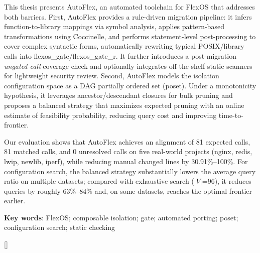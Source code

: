 \documentclass[UTF8,a4paper,12pt]{ctexart}
\numberwithin{equation}{section}
\renewcommand\thesection{\arabic{section}}
\begin{document}
This thesis presents AutoFlex, an automated toolchain for
FlexOS that addresses both barriers. First, AutoFlex provides a
rule-driven migration pipeline: it infers function-to-library mappings
via symbol analysis, applies pattern-based transformations using
Coccinelle, and performs statement-level post-processing to cover
complex syntactic forms, automatically rewriting typical POSIX/library
calls into flexos\_gate/flexos\_gate\_r. It further introduces a
post-migration \emph{ungated-call} coverage check and optionally
integrates off-the-shelf static scanners for lightweight security
review. Second, AutoFlex models the isolation configuration space as a
DAG partially ordered set (poset). Under a monotonicity hypothesis, it
leverages ancestor/descendant closures for bulk pruning and proposes a
balanced strategy that maximizes expected pruning with an online
estimate of feasibility probability, reducing query cost and improving
time-to-frontier.

Our evaluation shows that AutoFlex achieves an alignment of 81 expected
calls, 81 matched calls, and 0 unresolved calls on five real-world
projects (nginx, redis, lwip, newlib, iperf), while reducing manual
changed lines by 30.91\%--100\%. For configuration search, the balanced
strategy substantially lowers the average query ratio on multiple
datasets; compared with exhaustive search ($|V|$=96), it
reduces queries by roughly 63\%--84\% and, on some datasets, reaches the
optimal frontier earlier.

\hspace*{2em}\textbf{Key words}: FlexOS; composable isolation; gate; automated
porting; poset; configuration search; static checking


\newpage
{}

\renewcommand\contentsname{{目\quad 录}}

\begin{center}
{\tableofcontents
\thispagestyle{fancy}
}
\end{center}

\newpage
{}

\titleformat{\section}{\heiti\zihao{3}\centering}{\thesection}{0.5em}{}[]
\end{document}

